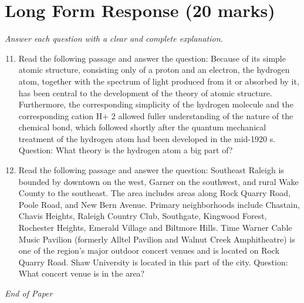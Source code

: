 \documentclass[12pt]{article}
\begin{document}
\section*{Long Form Response (20 marks)}
\textit{Answer each question with a clear and complete explanation.}
\begin{enumerate}[label=\arabic*.]
\setcounter{enumi}{10}
\item Read the following passage and answer the question: Because of its simple atomic structure, consisting only of a proton and an electron, the hydrogen atom, together with the spectrum of light produced from it or absorbed by it, has been central to the development of the theory of atomic structure. Furthermore, the corresponding simplicity of the hydrogen molecule and the corresponding cation H+ 2 allowed fuller understanding of the nature of the chemical bond, which followed shortly after the quantum mechanical treatment of the hydrogen atom had been developed in the mid-1920 s. Question: What theory is the hydrogen atom a big part of?
\item Read the following passage and answer the question: Southeast Raleigh is bounded by downtown on the west, Garner on the southwest, and rural Wake County to the southeast. The area includes areas along Rock Quarry Road, Poole Road, and New Bern Avenue. Primary neighborhoods include Chastain, Chavis Heights, Raleigh Country Club, Southgate, Kingwood Forest, Rochester Heights, Emerald Village and Biltmore Hills. Time Warner Cable Music Pavilion (formerly Alltel Pavilion and Walnut Creek Amphitheatre) is one of the region's major outdoor concert venues and is located on Rock Quarry Road. Shaw University is located in this part of the city. Question: What concert venue is in the area?
\end{enumerate}

\vfill
\noindent\textit{End of Paper}
\end{document}
